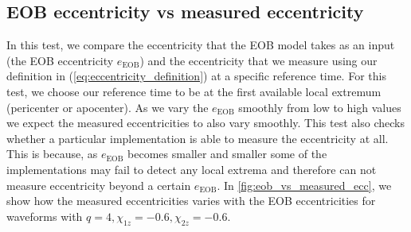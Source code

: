 \documentclass[aps,prd,amsmath,floats,floatfix, twocolumn,
superscriptaddress,nofootinbib,showpacs]{revtex4-1}
\begin{document}
\subsection{EOB eccentricity vs measured eccentricity}
\label{sec:eob-eccentricity-vs-measured-eccentricity}
In this test, we compare the eccentricity that the EOB model takes as an input (the EOB eccentricity $e_{\text{EOB}}$) and the eccentricity that we measure using
our definition in (\ref{eq:eccentricity_definition}) at a specific reference time. For this test, we choose our reference time to be at the first available local
extremum (pericenter or apocenter). As we vary the $e_{\text{EOB}}$ smoothly from low to high values we expect the measured eccentricities to also vary smoothly.
This test also checks whether a particular implementation is able to measure the eccentricity at all. This is because, as $e_{\text{EOB}}$ becomes smaller and smaller
some of the implementations may fail to detect any local extrema and therefore can not measure eccentricity beyond a certain $e_{\text{EOB}}$. In \ref{fig:eob_vs_measured_ecc},
we show how the measured eccentricities varies with the EOB eccentricities for waveforms with $q=4, \chi_{1z}=-0.6, \chi_{2z}=-0.6$.
\end{document}
